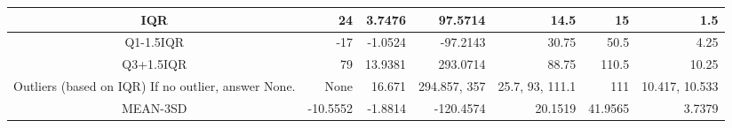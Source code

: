\begin{table}[H]
\begin{adjustbox}{width = \textwidth, center}
\begin{tabular}{|c|rrrrrr|}
            \cellcolor[HTML]{CFE2F3}IQR                                                  & \multicolumn{1}{r|}{24}                                         & \multicolumn{1}{r|}{3.7476}                                                  & \multicolumn{1}{r|}{97.5714}                                                     & \multicolumn{1}{r|}{14.5}                                & \multicolumn{1}{r|}{15}                                 & 1.5                                                              \\ \hline
            Q1-1.5IQR                                                                    & \multicolumn{1}{r|}{-17}                                        & \multicolumn{1}{r|}{-1.0524}                                                 & \multicolumn{1}{r|}{-97.2143}                                                    & \multicolumn{1}{r|}{30.75}                               & \multicolumn{1}{r|}{50.5}                               & 4.25                                                             \\ \hline
            Q3+1.5IQR                                                                    & \multicolumn{1}{r|}{79}                                         & \multicolumn{1}{r|}{13.9381}                                                 & \multicolumn{1}{r|}{293.0714}                                                    & \multicolumn{1}{r|}{88.75}                               & \multicolumn{1}{r|}{110.5}                              & 10.25                                                            \\ \hline
            \cellcolor[HTML]{D9D2E9}Outliers (based on IQR)  If no outlier, answer None. & \multicolumn{1}{r|}{None}                                       & \multicolumn{1}{r|}{16.671}                                                  & \multicolumn{1}{r|}{294.857, 357}                                                & \multicolumn{1}{r|}{25.7, 93, 111.1}                     & \multicolumn{1}{r|}{111}                                & 10.417, 10.533                                                   \\ \hline
            MEAN-3SD                                                                     & \multicolumn{1}{r|}{-10.5552}                                   & \multicolumn{1}{r|}{-1.8814}                                                 & \multicolumn{1}{r|}{-120.4574}                                                   & \multicolumn{1}{r|}{20.1519}                             & \multicolumn{1}{r|}{41.9565}                            & 3.7379                                                           \\ \hline

\end{tabular}
\end{adjustbox}
\end{table}
